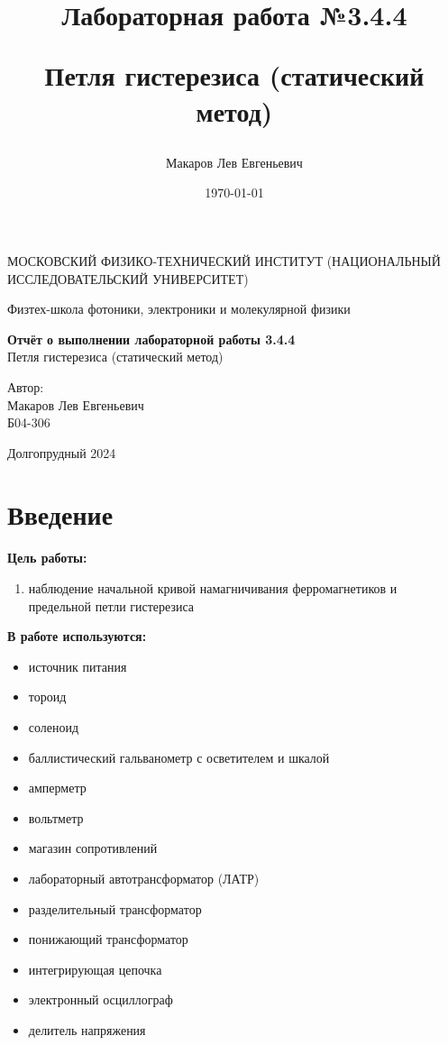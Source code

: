 \documentclass[a4paper,12pt]{article}
\author{Макаров Лев Евгеньевич}
\title{Лабораторная работа №3.4.4

Петля гистерезиса (статический метод)
}
\date{\today}
\begin{document}
\begin{titlepage}
	\begin{center}
		{\large МОСКОВСКИЙ ФИЗИКО-ТЕХНИЧЕСКИЙ ИНСТИТУТ (НАЦИОНАЛЬНЫЙ ИССЛЕДОВАТЕЛЬСКИЙ УНИВЕРСИТЕТ)}
	\end{center}
	\begin{center}
		{\large Физтех-школа фотоники, электроники и молекулярной физики}
	\end{center}
	
	
	\vspace{4.5cm}
	{\huge
		\begin{center}
			{\bf Отчёт о выполнении лабораторной работы 3.4.4}\\
			Петля гистерезиса (статический метод)
		\end{center}
	}
	\vspace{2cm}
	\begin{flushright}
		{\LARGE Автор:\\ Макаров Лев Евгеньевич \\
			\vspace{0.2cm}
			Б04-306}
	\end{flushright}
	\vspace{8cm}
	\begin{center}
		Долгопрудный 2024
	\end{center}
\end{titlepage}

\section{Введение}

\textbf{Цель работы:} 
\begin{enumerate}
	\item наблюдение начальной кривой намагничивания ферромагнетиков и предельной петли гистерезиса
\end{enumerate}

\textbf{В работе используются:} 
\begin{itemize}
    \item источник питания
    \item тороид
    \item соленоид
    \item баллистический гальванометр с осветителем и шкалой
    \item амперметр
    \item вольтметр
    \item магазин сопротивлений
    \item лабораторный автотрансформатор (ЛАТР)
    \item разделительный трансформатор
    \item понижающий трансформатор
    \item интегрирующая цепочка
    \item электронный осциллограф
    \item делитель напряжения
\end{itemize}
\medskip
\end{document}
